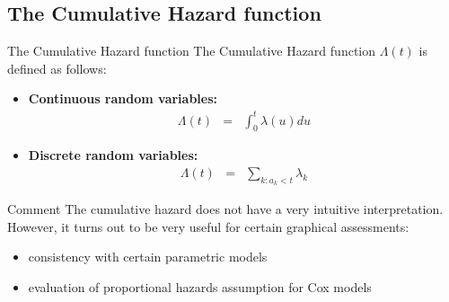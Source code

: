 \documentclass[envcountsect, 10pt, portrait, palatino]{beamer}
\begin{document}
\subsection{The Cumulative Hazard function}
\begin{frame}{The Cumulative Hazard function}
The Cumulative Hazard function $\Lambda(t)$ is defined as follows:\\
\begin{itemize}
\item {\bf Continuous random variables:}
\begin{eqnarray*}
\Lambda(t)  & = & \int_0^t \lambda(u) du
\end{eqnarray*}

\item {\bf Discrete random variables:}
\begin{eqnarray*}
\Lambda(t) & = &  \sum_{k:a_k<t} \lambda_k
\end{eqnarray*}
\end{itemize}
\end{frame}
\begin{frame}{Comment}
The cumulative hazard does not have a very intuitive interpretation.
\\[2ex]
However, it turns out to be very useful for certain graphical
assessments:
\begin{itemize}
\item consistency with certain parametric models
\item evaluation of proportional hazards assumption for Cox models
\end{itemize}
\end{frame}
\end{document}
